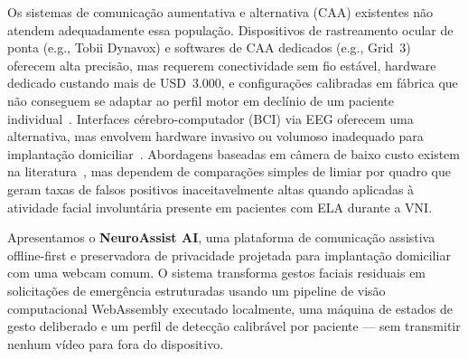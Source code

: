 Os sistemas de comunicação aumentativa e alternativa (CAA) existentes não atendem
adequadamente essa população. Dispositivos de rastreamento ocular de ponta (e.g.,
Tobii Dynavox) e softwares de CAA dedicados (e.g., Grid~3) oferecem alta precisão,
mas requerem conectividade sem fio estável, hardware dedicado custando mais de
USD~3.000, e configurações calibradas em fábrica que não conseguem se adaptar ao
perfil motor em declínio de um paciente individual~\cite{beukelman2013aac}.
Interfaces cérebro-computador (BCI) via EEG oferecem uma alternativa, mas envolvem
hardware invasivo ou volumoso inadequado para implantação domiciliar~\cite{zander2011passive}.
Abordagens baseadas em câmera de baixo custo existem na literatura~\cite{soukupova2016},
mas dependem de comparações simples de limiar por quadro que geram taxas de falsos
positivos inaceitavelmente altas quando aplicadas à atividade facial involuntária
presente em pacientes com ELA durante a VNI.

Apresentamos o \textbf{NeuroAssist AI}, uma plataforma de comunicação assistiva
offline-first e preservadora de privacidade projetada para implantação domiciliar com
uma webcam comum. O sistema transforma gestos faciais residuais em solicitações de
emergência estruturadas usando um pipeline de visão computacional WebAssembly
executado localmente, uma máquina de estados de gesto deliberado e um perfil de
detecção calibrável por paciente — sem transmitir nenhum vídeo para fora do
dispositivo.

